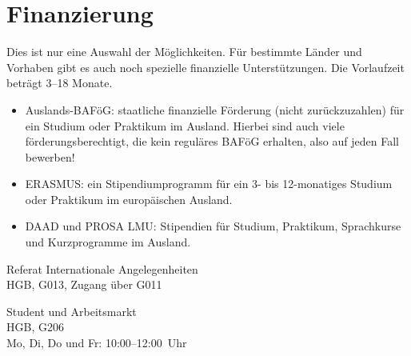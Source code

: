 \section{Finanzierung}

Dies ist nur eine Auswahl der Möglichkeiten. Für bestimmte Länder und
Vorhaben gibt es auch noch spezielle finanzielle Unterstützungen. Die
Vorlaufzeit beträgt 3--18 Monate.

\begin{itemize}
\item Auslands-BAFöG: staatliche finanzielle Förderung (nicht zurückzuzahlen) für ein Studium oder Praktikum im Ausland. Hierbei sind auch viele förderungsberechtigt, die kein reguläres BAFöG erhalten, also auf jeden Fall bewerben!
\item ERASMUS: ein Stipendiumprogramm für ein 3- bis 12-monatiges Studium oder Praktikum im europäischen Ausland.
\item DAAD und PROSA LMU: Stipendien für Studium, Praktikum, Sprachkurse und Kurzprogramme im Ausland.
\end{itemize}

Referat Internationale Angelegenheiten\\
HGB, G013, Zugang über G011\\
\begin{urlList}
\end{urlList}

Student und Arbeitsmarkt\\
HGB, G206\\
Mo, Di, Do und Fr: 10:00--12:00~Uhr\\
\begin{urlList}
\end{urlList}

